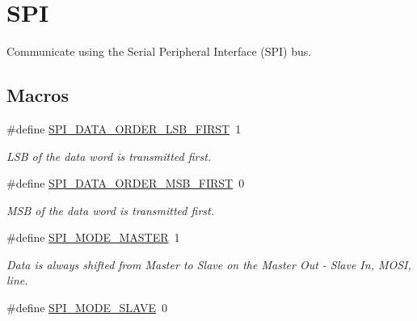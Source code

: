 \hypertarget{group__spi}{\section{S\-P\-I}
\label{group__spi}
}


Communicate using the Serial Peripheral Interface (S\-P\-I) bus.  


\subsection*{Macros}
\begin{DoxyCompactItemize}
\item 
\hypertarget{group__spi_ga28bc36b326e2cb697ffb6d0ddd3c6263}{\#define \hyperlink{group__spi_ga28bc36b326e2cb697ffb6d0ddd3c6263}{S\-P\-I\-\_\-\-D\-A\-T\-A\-\_\-\-O\-R\-D\-E\-R\-\_\-\-L\-S\-B\-\_\-\-F\-I\-R\-S\-T}~1}\label{group__spi_ga28bc36b326e2cb697ffb6d0ddd3c6263}

\begin{DoxyCompactList}\small\item\em L\-S\-B of the data word is transmitted first. \end{DoxyCompactList}\item 
\hypertarget{group__spi_ga654a276f377599a8cf352b984843d39c}{\#define \hyperlink{group__spi_ga654a276f377599a8cf352b984843d39c}{S\-P\-I\-\_\-\-D\-A\-T\-A\-\_\-\-O\-R\-D\-E\-R\-\_\-\-M\-S\-B\-\_\-\-F\-I\-R\-S\-T}~0}\label{group__spi_ga654a276f377599a8cf352b984843d39c}

\begin{DoxyCompactList}\small\item\em M\-S\-B of the data word is transmitted first. \end{DoxyCompactList}\item 
\hypertarget{group__spi_gaa335c2abdfad9e6f6c2677719d93b64e}{\#define \hyperlink{group__spi_gaa335c2abdfad9e6f6c2677719d93b64e}{S\-P\-I\-\_\-\-M\-O\-D\-E\-\_\-\-M\-A\-S\-T\-E\-R}~1}\label{group__spi_gaa335c2abdfad9e6f6c2677719d93b64e}

\begin{DoxyCompactList}\small\item\em Data is always shifted from Master to Slave on the Master Out -\/ Slave In, M\-O\-S\-I, line. \end{DoxyCompactList}\item 
\hypertarget{group__spi_ga75f094fee5a9dc10b88401ccd17925d3}{\#define \hyperlink{group__spi_ga75f094fee5a9dc10b88401ccd17925d3}{S\-P\-I\-\_\-\-M\-O\-D\-E\-\_\-\-S\-L\-A\-V\-E}~0}\label{group__spi_ga75f094fee5a9dc10b88401ccd17925d3}


\end{DoxyCompactItemize}
